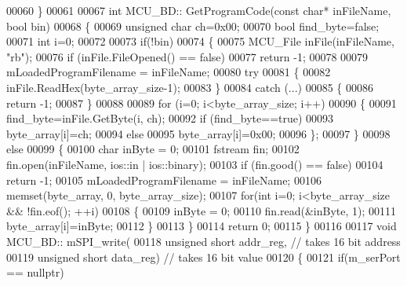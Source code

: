 \begin{DoxyCode}
00060 \}
00061 
00067 \textcolor{keywordtype}{int} MCU\_BD:: GetProgramCode(\textcolor{keyword}{const} \textcolor{keywordtype}{char}* inFileName, \textcolor{keywordtype}{bool} bin)
00068 \{
00069     \textcolor{keywordtype}{unsigned} \textcolor{keywordtype}{char} ch=0x00;
00070     \textcolor{keywordtype}{bool} find\_byte=\textcolor{keyword}{false};
00071     \textcolor{keywordtype}{int} i=0;
00072 
00073     \textcolor{keywordflow}{if}(!bin)
00074     \{
00075         MCU_File    inFile(inFileName, \textcolor{stringliteral}{"rb"});
00076         \textcolor{keywordflow}{if} (inFile.FileOpened() == \textcolor{keyword}{false})
00077             \textcolor{keywordflow}{return} -1;
00078 
00079         mLoadedProgramFilename = inFileName;
00080         \textcolor{keywordflow}{try}
00081         \{
00082             inFile.ReadHex(byte\_array\_size-1);
00083         \}
00084         \textcolor{keywordflow}{catch} (...)
00085         \{
00086             \textcolor{keywordflow}{return} -1;
00087         \}
00088 
00089         \textcolor{keywordflow}{for} (i=0; i<byte\_array\_size; i++)
00090         \{
00091             find\_byte=inFile.GetByte(i, ch);
00092             \textcolor{keywordflow}{if} (find\_byte==\textcolor{keyword}{true})
00093                 byte\_array[i]=ch;
00094             \textcolor{keywordflow}{else}
00095                 byte\_array[i]=0x00;
00096         \};
00097     \}
00098     \textcolor{keywordflow}{else}
00099     \{
00100         \textcolor{keywordtype}{char} inByte = 0;
00101         fstream fin;
00102         fin.open(inFileName, ios::in | ios::binary);
00103         \textcolor{keywordflow}{if} (fin.good() == \textcolor{keyword}{false})
00104             \textcolor{keywordflow}{return} -1;
00105         mLoadedProgramFilename = inFileName;
00106         memset(byte\_array, 0, byte\_array\_size);
00107         \textcolor{keywordflow}{for}(\textcolor{keywordtype}{int} i=0; i<byte\_array\_size && !fin.eof(); ++i)
00108         \{
00109             inByte = 0;
00110             fin.read(&inByte, 1);
00111             byte\_array[i]=inByte;
00112         \}
00113     \}
00114     \textcolor{keywordflow}{return} 0;
00115 \}
00116 
00117 \textcolor{keywordtype}{void} MCU\_BD:: mSPI\_write(
00118             \textcolor{keywordtype}{unsigned} \textcolor{keywordtype}{short} addr\_reg,  \textcolor{comment}{// takes 16 bit address}
00119             \textcolor{keywordtype}{unsigned} \textcolor{keywordtype}{short} data\_reg)  \textcolor{comment}{// takes 16 bit value}
00120 \{
00121     \textcolor{keywordflow}{if}(m\_serPort == \textcolor{keyword}{nullptr})

\end{DoxyCode}

